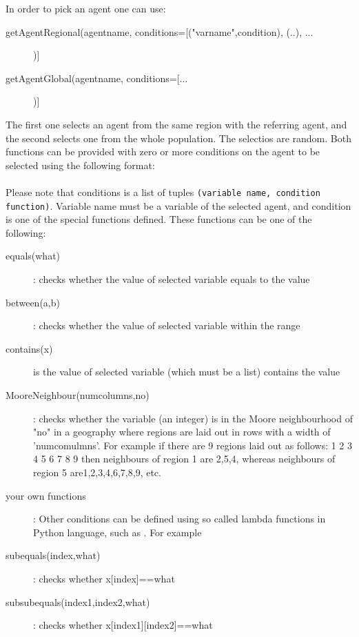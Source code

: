 In order to pick an agent one can use:
\begin{description}
\item[getAgentRegional(agentname, conditions=[("varname",condition), (..), ...])]
\item[getAgentGlobal(agentname, conditions=[...])]
\end{description}
The first one selects an agent from the same region with the referring agent, and the second selects one from the whole population. The selectios are random. Both functions can be provided with zero or more conditions on the agent to be selected using the following format:\\
\\
Please note that conditions is a list of tuples {\tt (variable name, condition function)}. Variable name must be a variable of the selected agent, and condition is one of the special functions defined. These functions can be one of the following:
\begin{description}
   \item[equals(what)]: checks whether the value of selected variable equals  to the value
   \item[between(a,b)]: checks whether the value of selected variable within the range
   \item[contains(x)] is the value of selected variable (which must be a list) contains the value
   \item[MooreNeighbour(numcolumns,no)]: checks whether the variable (an integer) is in the Moore neighbourhood of "no" in a geography where regions are laid out in rows with a width of 'numcomulmns'. For example if there are 9 regions laid out as follows:
      1    2    3
      4    5    6
      7    8    9
    then neighbours of region 1 are 2,5,4, whereas neighbours of region 5 are1,2,3,4,6,7,8,9, etc.
   \item[your own functions]: Other conditions can be defined using so called lambda functions in Python language, such as  . For example 
   \item[subequals(index,what)]: checks whether x[index]==what
   \item[subsubequals(index1,index2,what)]: checks whether x[index1][index2]==what
\end{description}

